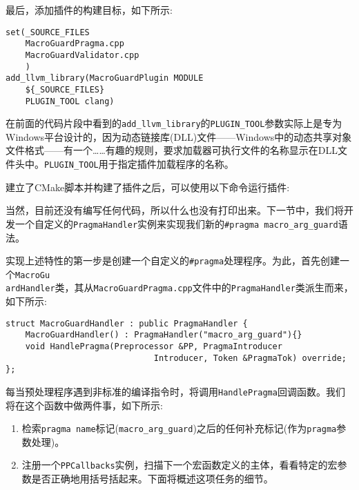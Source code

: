 最后，添加插件的构建目标，如下所示:

\begin{lstlisting}[style=styleCMake]
set(_SOURCE_FILES
	MacroGuardPragma.cpp
	MacroGuardValidator.cpp
	)
add_llvm_library(MacroGuardPlugin MODULE
	${_SOURCE_FILES}
	PLUGIN_TOOL clang)
\end{lstlisting}

\begin{tcolorbox}[colback=blue!5!white,colframe=blue!75!black, fonttitle=\bfseries,title=PLUGIN\_TOOL的参数]
\hspace*{0.7cm}在前面的代码片段中看到的\texttt{add\_llvm\_library}的\texttt{PLUGIN\_TOOL}参数实际上是专为Windows平台设计的，因为动态链接库(DLL)文件——Windows中的动态共享对象文件格式——有一个……有趣的规则，要求加载器可执行文件的名称显示在DLL文件头中。\texttt{PLUGIN\_TOOL}用于指定插件加载程序的名称。
\end{tcolorbox}

建立了CMake脚本并构建了插件之后，可以使用以下命令运行插件:


当然，目前还没有编写任何代码，所以什么也没有打印出来。下一节中，我们将开发一个自定义的\texttt{PragmaHandler}实例来实现我们新的\texttt{\#pragma macro\_arg\_guard}语法。


实现上述特性的第一步是创建一个自定义的\texttt{\#pragma}处理程序。为此，首先创建一个\texttt{MacroGu\\ardHandler}类，其从\texttt{MacroGuardPragma.cpp}文件中的\texttt{PragmaHandler}类派生而来，如下所示:

\begin{lstlisting}[style=styleCXX]
struct MacroGuardHandler : public PragmaHandler {
	MacroGuardHandler() : PragmaHandler("macro_arg_guard"){}
	void HandlePragma(Preprocessor &PP, PragmaIntroducer
					          Introducer, Token &PragmaTok) override;
};
\end{lstlisting}

每当预处理程序遇到非标准的编译指令时，将调用\texttt{HandlePragma}回调函数。我们将在这个函数中做两件事，如下所示:

\begin{enumerate}
\item 检索\texttt{pragma name}标记(\texttt{macro\_arg\_guard})之后的任何补充标记(作为\texttt{pragma}参数处理)。

\item 注册一个\texttt{PPCallbacks}实例，扫描下一个宏函数定义的主体，看看特定的宏参数是否正确地用括号括起来。下面将概述这项任务的细节。
\end{enumerate}

